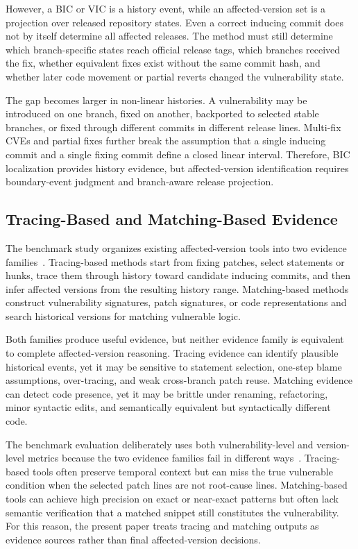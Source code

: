 However, a BIC or VIC is a history event, while an affected-version set is a projection over released repository states. Even a correct inducing commit does not by itself determine all affected releases. The method must still determine which branch-specific states reach official release tags, which branches received the fix, whether equivalent fixes exist without the same commit hash, and whether later code movement or partial reverts changed the vulnerability state.

The gap becomes larger in non-linear histories. A vulnerability may be introduced on one branch, fixed on another, backported to selected stable branches, or fixed through different commits in different release lines. Multi-fix CVEs and partial fixes further break the assumption that a single inducing commit and a single fixing commit define a closed linear interval. Therefore, BIC localization provides history evidence, but affected-version identification requires boundary-event judgment and branch-aware release projection.

\subsection{Tracing-Based and Matching-Based Evidence}

The benchmark study organizes existing affected-version tools into two evidence families~\cite{howfar2025}. Tracing-based methods start from fixing patches, select statements or hunks, trace them through history toward candidate inducing commits, and then infer affected versions from the resulting history range. Matching-based methods construct vulnerability signatures, patch signatures, or code representations and search historical versions for matching vulnerable logic.

Both families produce useful evidence, but neither evidence family is equivalent to complete affected-version reasoning. Tracing evidence can identify plausible historical events, yet it may be sensitive to statement selection, one-step blame assumptions, over-tracing, and weak cross-branch patch reuse. Matching evidence can detect code presence, yet it may be brittle under renaming, refactoring, minor syntactic edits, and semantically equivalent but syntactically different code.

The benchmark evaluation deliberately uses both vulnerability-level and version-level metrics because the two evidence families fail in different ways~\cite{howfar2025}. Tracing-based tools often preserve temporal context but can miss the true vulnerable condition when the selected patch lines are not root-cause lines. Matching-based tools can achieve high precision on exact or near-exact patterns but often lack semantic verification that a matched snippet still constitutes the vulnerability. For this reason, the present paper treats tracing and matching outputs as evidence sources rather than final affected-version decisions.

